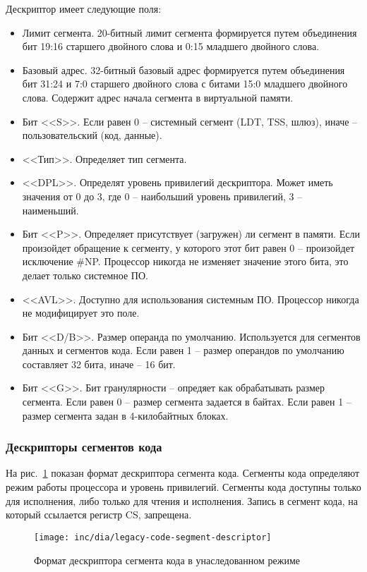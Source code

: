 Дескриптор имеет следующие поля:
\begin{itemize}
\item Лимит сегмента. 20-битный лимит сегмента формируется путем объединения
	бит 19:16 старшего двойного слова и 0:15 младшего двойного слова.
\item Базовый адрес. 32-битный базовый адрес формируется путем объединения бит 31:24 и 7:0 старшего двойного слова
	с битами 15:0 младшего двойного слова. Содержит адрес начала сегмента в виртуальной памяти.
\item Бит <<S>>. Если равен 0 -- системный сегмент (LDT, TSS, шлюз), иначе -- пользовательский (код, данные).
\item <<Тип>>. Определяет тип сегмента.
\item <<DPL>>. Определят уровень привилегий дескриптора. Может иметь значения от 0 до 3, где 0 -- наибольший
	уровень привилегий, 3 -- наименьший.
\item Бит <<P>>. Определяет присутствует (загружен) ли сегмент в памяти. Если произойдет обращение к сегменту,
	у которого этот бит равен 0 -- произойдет исключение \#NP. Процессор никогда не изменяет значение
	этого бита, это делает только системное ПО.
\item <<AVL>>. Доступно для использования системным ПО. Процессор никогда не модифицирует это поле.
\item Бит <<D/B>>. Размер операнда по умолчанию. Используется для сегментов данных и сегментов кода.
	Если равен 1 -- размер операндов по умолчанию составляет 32 бита, иначе -- 16 бит.
\item Бит <<G>>. Бит гранулярности -- опредяет как обрабатывать размер сегмента. Если равен 0 -- размер сегмента
	задается в байтах. Если равен 1 -- размер сегмента задан в 4-килобайтных блоках.
\end{itemize}

\subsubsection*{Дескрипторы сегментов кода}
На рис.~\ref{fig:legacy-code-segment-descriptor-format} показан формат дескриптора сегмента кода.
Сегменты кода определяют режим работы процессора и уровень привилегий. Сегменты кода доступны только для исполнения,
либо только для чтения и исполнения. Запись в сегмент кода, на который ссылается регистр CS, запрещена.
\begin{figure}[ht!]
  \centering
  \texttt{[image: inc/dia/legacy-code-segment-descriptor]}
  \caption{Формат дескриптора сегмента кода в унаследованном режиме}
  \label{fig:legacy-code-segment-descriptor-format}
\end{figure}

